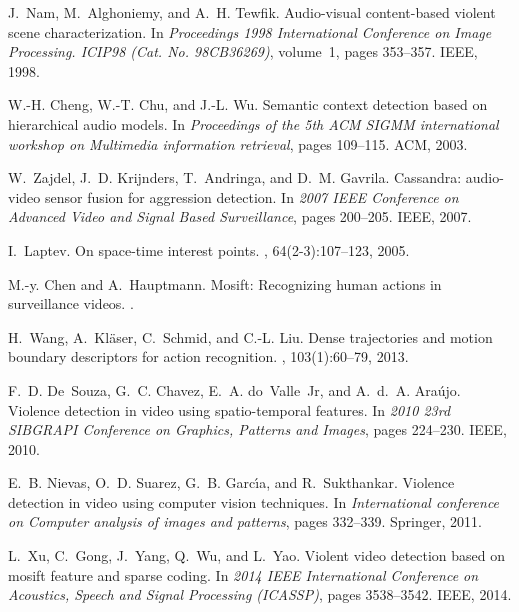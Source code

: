 \documentclass[10pt,twocolumn,letterpaper]{article}
\begin{document}
{\small
\begin{thebibliography}{10}\itemsep=-1pt

J.~Nam, M.~Alghoniemy, and A.~H. Tewfik.
\newblock Audio-visual content-based violent scene characterization.
\newblock In {\em Proceedings 1998 International Conference on Image
	Processing. ICIP98 (Cat. No. 98CB36269)}, volume~1, pages 353--357. IEEE,
	1998.

W.-H. Cheng, W.-T. Chu, and J.-L. Wu.
\newblock Semantic context detection based on hierarchical audio models.
\newblock In {\em Proceedings of the 5th ACM SIGMM international workshop on
	Multimedia information retrieval}, pages 109--115. ACM, 2003.

W.~Zajdel, J.~D. Krijnders, T.~Andringa, and D.~M. Gavrila.
\newblock Cassandra: audio-video sensor fusion for aggression detection.
\newblock In {\em 2007 IEEE Conference on Advanced Video and Signal Based
	Surveillance}, pages 200--205. IEEE, 2007.

I.~Laptev.
\newblock On space-time interest points.
, 64(2-3):107--123,
	2005.

M.-y. Chen and A.~Hauptmann.
\newblock Mosift: Recognizing human actions in surveillance videos.
.

H.~Wang, A.~Kl{\"a}ser, C.~Schmid, and C.-L. Liu.
\newblock Dense trajectories and motion boundary descriptors for action
	recognition.
, 103(1):60--79, 2013.

F.~D. De~Souza, G.~C. Chavez, E.~A. do~Valle~Jr, and A.~d.~A. Ara{\'u}jo.
\newblock Violence detection in video using spatio-temporal features.
\newblock In {\em 2010 23rd SIBGRAPI Conference on Graphics, Patterns and
	Images}, pages 224--230. IEEE, 2010.

E.~B. Nievas, O.~D. Suarez, G.~B. Garc{\'\i}a, and R.~Sukthankar.
\newblock Violence detection in video using computer vision techniques.
\newblock In {\em International conference on Computer analysis of images and
	patterns}, pages 332--339. Springer, 2011.

L.~Xu, C.~Gong, J.~Yang, Q.~Wu, and L.~Yao.
\newblock Violent video detection based on mosift feature and sparse coding.
\newblock In {\em 2014 IEEE International Conference on Acoustics, Speech and
	Signal Processing (ICASSP)}, pages 3538--3542. IEEE, 2014.


\end{thebibliography}}
\end{document}

